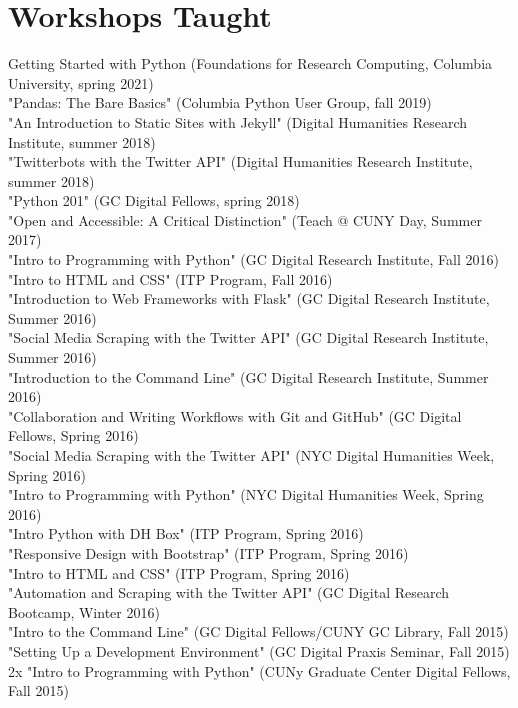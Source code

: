 \documentclass[11pt]{article}
\begin{document}
\section*{Workshops Taught}
\label{sec:orgheadline12}
Getting Started with Python (Foundations for Research Computing, Columbia University, spring 2021)\\
"Pandas: The Bare Basics" (Columbia Python User Group, fall 2019)\\
"An Introduction to Static Sites with Jekyll" (Digital Humanities Research Institute, summer 2018)\\
"Twitterbots with the Twitter API" (Digital Humanities Research Institute, summer 2018)\\
"Python 201" (GC Digital Fellows, spring 2018)\\
"Open and Accessible: A Critical Distinction" (Teach @ CUNY Day, Summer 2017)\\
"Intro to Programming with Python" (GC Digital Research Institute, Fall 2016)\\
"Intro to HTML and CSS" (ITP Program, Fall 2016)\\
"Introduction to Web Frameworks with Flask" (GC Digital Research Institute, Summer 2016)\\
"Social Media Scraping with the Twitter API" (GC Digital Research Institute, Summer 2016)\\
"Introduction to the Command Line" (GC Digital Research Institute, Summer 2016)\\
"Collaboration and Writing Workflows with Git and GitHub" (GC Digital Fellows, Spring 2016)\\
"Social Media Scraping with the Twitter API" (NYC Digital Humanities Week, Spring 2016)\\
"Intro to Programming with Python" (NYC Digital Humanities Week, Spring 2016)\\
"Intro Python with DH Box" (ITP Program, Spring 2016)\\
"Responsive Design with Bootstrap" (ITP Program, Spring 2016)\\
"Intro to HTML and CSS" (ITP Program, Spring 2016)\\
"Automation and Scraping with the Twitter API" (GC Digital Research Bootcamp, Winter 2016)\\
"Intro to the Command Line" (GC Digital Fellows/CUNY GC Library, Fall 2015)\\
"Setting Up a Development Environment" (GC Digital Praxis Seminar, Fall 2015)\\
2x "Intro to Programming with Python" (CUNy Graduate Center Digital Fellows, Fall 2015)\\
\end{document}
